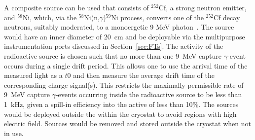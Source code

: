 A composite source can be used that consists  of $^{252}$Cf, a strong neutron emitter, and $^{58}$Ni, which, via the $^{58}$Ni(n,$\gamma$)$^{59}$Ni process, converts one of the $^{252}$Cf decay neutrons, suitably moderated, to a monoergetic 9 MeV photon~\cite{Rogers:1996ks}. The source would have an inner diameter of \SI{20}{\cm} and be deployable via the multipurpose instrumentation ports  discussed in Section~\ref{sec:FTs}. The activity of the radioactive source is chosen such that no more than one \SI{9}{\MeV} capture $\gamma$-event occurs during a single %
drift period. This allows one to use the arrival time of the measured light as a $t0$ and then measure the average drift time of the corresponding charge signal(s).
This restricts the maximally permissible rate of \SI{9}{\MeV} capture $\gamma$-events occurring inside the radioactive source to be less
than \SI{1}{\kilo\hertz}, given a spill-in efficiency into the active  of
less than \num{10}\%. 
The sources would be deployed outside the  within the cryostat to avoid regions with high electric field. Sources would be removed and stored outside the cryostat when not in use.





